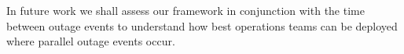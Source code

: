 \documentclass[conference]{IEEEtran}
\begin{document}
In future work we shall assess our framework in conjunction with the time between outage events to understand how best operations teams can be deployed where parallel outage events occur.  \par
\vspace{-5mm}

%
%



%
%
\end{document}
